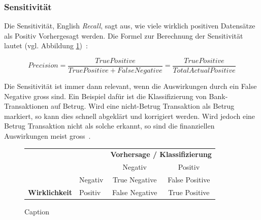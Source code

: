 \subsubsection{Sensitivität}

Die Sensitivität, English \textit{Recall}, sagt aus, wie viele wirklich positiven Datensätze als Positiv Vorhergesagt werden. Die Formel zur Berechnung der Sensitivität lautet (vgl. Abbildung \ref{cm-recall})~\autocite{TDSAccuracy}: 

$$Precision = \frac{True Positive}{True Positive + False Negative} = \frac{True Positive}{Total Actual Positive}$$

Die Sensitivität ist immer dann relevant, wenn die Auswirkungen durch ein False Negative gross sind. Ein Beispiel dafür ist die Klassifizierung von Bank-Transaktionen auf Betrug. Wird eine nicht-Betrug Transaktion als Betrug markiert, so kann dies schnell abgeklärt und korrigiert werden. Wird jedoch eine Betrug Transaktion nicht als solche erkannt, so sind die finanziellen Auswirkungen meist gross~\autocite{TDSAccuracy}.

\begin{figure}[h]
    \centering
    \def\arraystretch{1.5}
    \begin{tabular}{llcc}
        \multicolumn{2}{l}{}                                                                                                & \multicolumn{2}{c}{\textbf{Vorhersage / Klassifizierung}}                                                                \\ \cline{3-4} 
        \multicolumn{1}{c}{\textbf{}}                                & \multicolumn{1}{l|}{}                                & \multicolumn{1}{c|}{Negativ}                                & \multicolumn{1}{c|}{Positiv}                               \\ \cline{2-4} 
        \multicolumn{1}{l|}{}                                        & \multicolumn{1}{l|}{Negativ}                         & \multicolumn{1}{c|}{True Negative}                          & \multicolumn{1}{c|}{False Positive}                        \\ \cline{2-4} 
        \multicolumn{1}{l|}{\multirow{-2}{*}{\textbf{Wirklichkeit}}} & \multicolumn{1}{l|}{\cellcolor[HTML]{B5D0EE}Positiv} & \multicolumn{1}{c|}{\cellcolor[HTML]{B5D0EE}False Negative} & \multicolumn{1}{c|}{\cellcolor[HTML]{B5D0EE}True Positive} \\ \cline{2-4} 
    \end{tabular}
    \caption{Caption}
    \label{cm-recall}
\end{figure}

